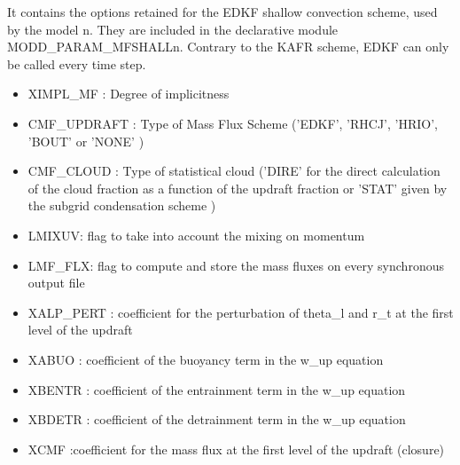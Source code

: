 It contains the options retained for the EDKF shallow convection scheme, used
by the  model n. They are included in the declarative module
MODD\_PARAM\_MFSHALLn. Contrary to the KAFR scheme,
EDKF can only be called  every time step. 

\begin{itemize}
\item
{}
XIMPL\_MF : Degree of implicitness                                                        
\item
{}
CMF\_UPDRAFT : Type of Mass Flux Scheme                              
('EDKF', 'RHCJ', 'HRIO', 'BOUT' or 'NONE' )
\item
{}
CMF\_CLOUD : Type of statistical cloud                                 
('DIRE' for the direct calculation of the cloud fraction as a function of the updraft fraction 
or 'STAT' given by the subgrid condensation scheme )
\item
{}
LMIXUV: flag to take into account the mixing on momentum      
\item
{}
LMF\_FLX: flag to compute and store the mass fluxes on every synchronous output  file
\item
{}
XALP\_PERT : coefficient for the perturbation of theta\_l and r\_t at the first level of the updraft
\item
{}
XABUO : coefficient of the buoyancy term in the w\_up equation
\item
{}
XBENTR : coefficient of the entrainment term in the w\_up equation
\item
{}
XBDETR : coefficient of the detrainment term in the w\_up equation
\item
{}
XCMF :coefficient for the mass flux at the first level of the updraft (closure)


\end{itemize}
